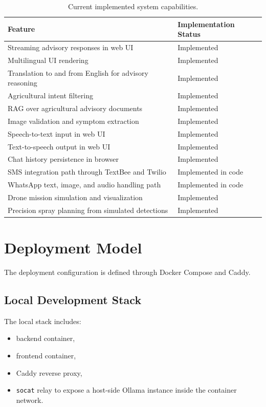\documentclass[11pt,a4paper]{article}
\begin{document}
\begin{table}[H]
\centering
\begin{tabularx}{\textwidth}{>{\raggedright\arraybackslash}p{} X}
\toprule
\textbf{Feature} & \textbf{Implementation Status} \\
\midrule
Streaming advisory responses in web UI & Implemented \\
Multilingual UI rendering & Implemented \\
Translation to and from English for advisory reasoning & Implemented \\
Agricultural intent filtering & Implemented \\
RAG over agricultural advisory documents & Implemented \\
Image validation and symptom extraction & Implemented \\
Speech-to-text input in web UI & Implemented \\
Text-to-speech output in web UI & Implemented \\
Chat history persistence in browser & Implemented \\
SMS integration path through TextBee and Twilio & Implemented in code \\
WhatsApp text, image, and audio handling path & Implemented in code \\
Drone mission simulation and visualization & Implemented \\
Precision spray planning from simulated detections & Implemented \\
\bottomrule
\end{tabularx}
\caption{Current implemented system capabilities.}
\end{table}

\section{Deployment Model}

The deployment configuration is defined through Docker Compose and Caddy.

\subsection{Local Development Stack}

The local stack includes:

\begin{itemize}
  \item backend container,
  \item frontend container,
  \item Caddy reverse proxy,
  \item \texttt{socat} relay to expose a host-side Ollama instance inside the container network.
\end{itemize}
\end{document}
